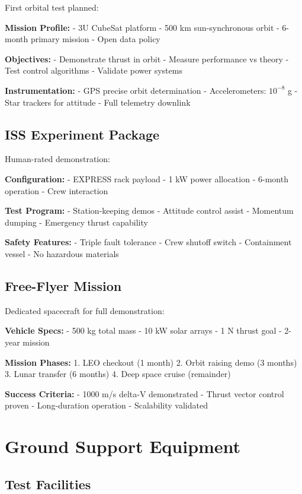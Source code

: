 \documentclass[12pt,letterpaper]{book}
\theoremstyle{definition}
\theoremstyle{plain}
\theoremstyle{remark}
\begin{document}
{{{{{First orbital test planned:

\textbf{Mission Profile:}
- 3U CubeSat platform
- 500 km sun-synchronous orbit
- 6-month primary mission
- Open data policy

\textbf{Objectives:}
- Demonstrate thrust in orbit
- Measure performance vs theory
- Test control algorithms
- Validate power systems

\textbf{Instrumentation:}
- GPS precise orbit determination
- Accelerometers: $10^{-8}$ g
- Star trackers for attitude
- Full telemetry downlink

\subsection{ISS Experiment Package}

Human-rated demonstration:

\textbf{Configuration:}
- EXPRESS rack payload
- 1 kW power allocation
- 6-month operation
- Crew interaction

\textbf{Test Program:}
- Station-keeping demos
- Attitude control assist
- Momentum dumping
- Emergency thrust capability

\textbf{Safety Features:}
- Triple fault tolerance
- Crew shutoff switch
- Containment vessel
- No hazardous materials

\subsection{Free-Flyer Mission}

Dedicated spacecraft for full demonstration:

\textbf{Vehicle Specs:}
- 500 kg total mass
- 10 kW solar arrays
- 1 N thrust goal
- 2-year mission

\textbf{Mission Phases:}
1. LEO checkout (1 month)
2. Orbit raising demo (3 months)
3. Lunar transfer (6 months)
4. Deep space cruise (remainder)

\textbf{Success Criteria:}
- 1000 m/s delta-V demonstrated
- Thrust vector control proven
- Long-duration operation
- Scalability validated

\section{Ground Support Equipment}

\subsection{Test Facilities}

}}}}}
\end{document}
